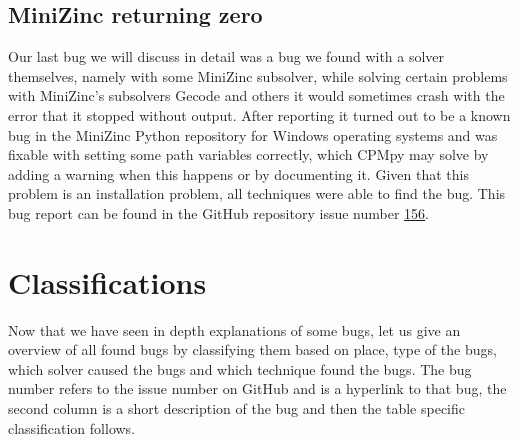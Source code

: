 \subsection{MiniZinc returning zero}
\label{res:bug:MinizincZero}
Our last bug we will discuss in detail was a bug we found with a solver themselves, namely with some MiniZinc subsolver, while solving certain problems with MiniZinc’s subsolvers Gecode and others it would sometimes crash with the error that it stopped without output. After reporting it turned out to be a known bug in the MiniZinc Python repository for Windows operating systems and was fixable with setting some path variables correctly, which CPMpy may solve by adding a warning when this happens or by documenting it.
Given that this problem is an installation problem, all techniques were able to find the bug. This bug report can be found in the GitHub repository issue number \href{https://github.com/CPMpy/cpmpy/issues/156}{156}.

%
%





\section{Classifications}
\label{res:Classifications}
Now that we have seen in depth explanations of some bugs, let us give an overview of all found bugs by classifying them based on place, type of the bugs, which solver caused the bugs and which technique found the bugs. The bug number refers to the issue number on GitHub and is a hyperlink to that bug, the second column is a short description of the bug and then the table specific classification follows.

